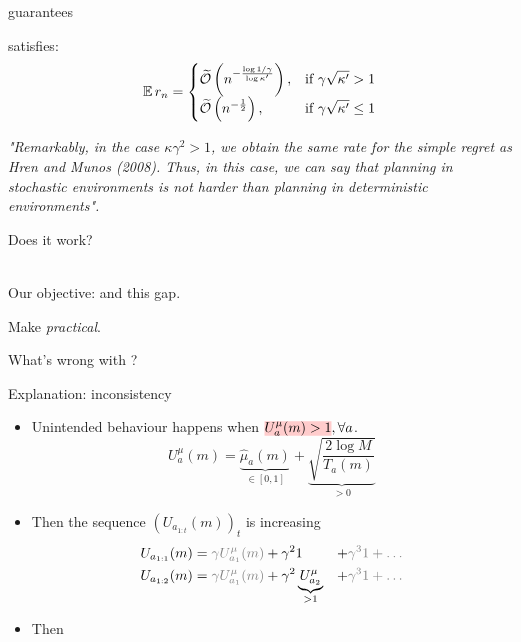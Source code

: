 \documentclass{beamer}
\begin{document}
\begin{frame}{\OLOP guarantees}
\begin{theorem}
\label{thm:regret}
\OLOP satisfies:
\begin{equation*}
    \expectedvalue r_n = \begin{cases}
      \tilde{\cO}\left(n^{-\frac{\log 1/\gamma}{\log \kappa'}}\right), & \text{if}\ \gamma\sqrt{\kappa'} > 1 \\
      \tilde{\cO}\left(n^{-\frac{1}{2}}\right), & \text{if}\ \gamma\sqrt{\kappa'} \leq 1
    \end{cases}
\end{equation*}
\end{theorem}
\begin{center}
    \emph{"Remarkably, in the case $\kappa \gamma^2 > 1$, we obtain the same rate for the simple regret as Hren and Munos (2008). Thus, in this case, we can say that planning in stochastic environments is not harder than planning in deterministic environments".}
\end{center}
\end{frame}


\begin{frame}{Does it work?}
\begin{center}
     \\
    Our objective:  and  this gap.
\end{center}
\begin{flushright}
Make \OLOP \emph{practical}.
\end{flushright}
\end{frame}

\begin{frame}{What's wrong with \OLOP?}
    \begin{alertblock}{Explanation: inconsistency}
    \begin{itemize}
        \item Unintended behaviour happens when $\hler{U^{\mu}_a(m) > 1}, \forall a$.
        \begin{equation*}
             U^{\mu}_a(m) = \underbrace{\hat{\mu}_a(m)}_{\in [0,1]} + \underbrace{\sqrt{\frac{2 \log M}{T_a(m)}}}_{> 0}
        \end{equation*}
        \pause
        \item Then the sequence $(U_{a_{1:t}}(m))_t$ is increasing
        \begin{align*}
        U_{a_{1:1}}(m) &=   \textcolor{gray}{\gamma U^{\mu}_{a_{1}}(m)} + \gamma^2 1 &+ \textcolor{gray}{\gamma^3 1 + \dots} \\
        U_{a_{1:2}}(m) &=  \textcolor{gray}{\gamma U^{\mu}_{a_{1}}(m)} + \gamma^2 \underbrace{U^{\mu}_{a_{2}}}_{>1} &+ \textcolor{gray}{\gamma^3 1 + \dots}
        \end{align*}
        \pause
        \item Then 
    \end{itemize}
    \end{alertblock}
    
\end{frame}
\end{document}
